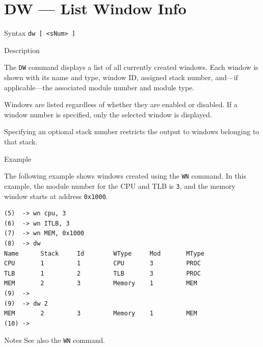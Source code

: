 %
%
\pagebreak
\section*{DW — List Window Info}

\begin{iPageDescEntry}{Syntax}
\texttt{dw [ <sNum> ]}
\end{iPageDescEntry}

\begin{iPageDescEntry}{Description}

The \texttt{DW} command displays a list of all currently created windows.
Each window is shown with its name and type, window ID, assigned stack number,
and—if applicable—the associated module number and module type.

Windows are listed regardless of whether they are enabled or disabled.
If a window number is specified, only the selected window is displayed.

Specifying an optional stack number restricts the output to windows belonging
to that stack.

\end{iPageDescEntry}

\begin{iPageDescOpEntry}{Example}

The following example shows windows created using the \texttt{WN} command.
In this example, the module number for the CPU and TLB is \texttt{3}, and the
memory window starts at address \texttt{0x1000}.

\begin{lstlisting}[style=iPageOpStyle]
(5)  -> wn cpu, 3
(6)  -> wn ITLB, 3
(7)  -> wn MEM, 0x1000
(8)  -> dw
Name      Stack     Id        WType     Mod       MType     
CPU       1         1         CPU       3         PROC      
TLB       1         2         TLB       3         PROC      
MEM       2         3         Memory    1         MEM       
(9)  ->
(9)  -> dw 2
MEM       2         3         Memory    1         MEM 
(10) ->
\end{lstlisting}

\end{iPageDescOpEntry}

\begin{iPageDescEntry}{Notes}
See also the \texttt{WN} command.
\end{iPageDescEntry}
